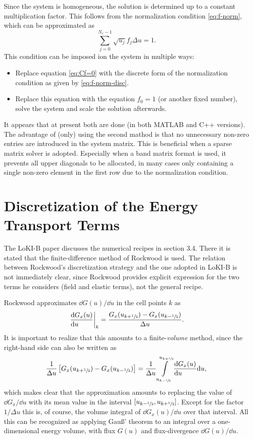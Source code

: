 \documentclass{book}
\newcommand{\frachalf}{\ensuremath{\sfrac{1}{2}}}
\newcommand{\phalf}[1]{\ensuremath{{#1}+\frachalf}}
\newcommand{\mhalf}[1]{\ensuremath{{#1}-\frachalf}}
\begin{document}
Since the system is homogeneous, the solution is determined up to a constant
multiplication factor. This follows from the normalization condition
\eqref{eq:f-norm}, which can be approximated as
\begin{equation}
  \sum\limits_{j=0}^{N_c-1} \sqrt{u_j} f_j \Delta u = 1.
  \label{eq:f-norm-disc}
\end{equation}
This condition can be imposed ion the system in multiple ways:
\begin{itemize}
  \item Replace equation \eqref{eq:Cf=0} with the discrete form of the
    normalization condition as given by \eqref{eq:f-norm-disc}.
  \item Replace this equation with the equation $f_0=1$ (or another fixed
    number), solve the system and scale the solution afterwards.
\end{itemize}
It appears that at present both are done (in both MATLAB and C++ versions). The
advantage of (only) using the second mathod is that no unnecessary non-zero
entries are introduced in the system matrix. This is beneficial when a sparse
matrix solver is adopted. Especially when a band matrix format is used, it
prevents all upper diagonals to be allocated, in many cases only containing
a single non-zero element in the first row due to the normalization condition.

\section{Discretization of the Energy Transport Terms}
\label{sec:dGdu-disc}

The LoKI-B paper \cite{Tejero2019} discusses the numerical recipes in
section 3.4. There it is stated that the finite-difference method of
Rockwood \cite[appendix A]{Rockwood1973} is used. The relation between Rockwood's
discretization strategy and the one adopted in LoKI-B is not immediately
clear, since Rockwood provides explicit expression for the two terms
he considers (field and elastic terms), not the general recipe.

Rockwood approximates $\dd{G(u)}/\dd{u}$ in the cell points $k$ as
\begin{equation}
  \left.\DERIV{G_x(u)}{u}\right|_k
  = \frac{G_x(u_{\phalf{k}}) - G_x(u_{\mhalf{k}})}{\Delta u}.
\end{equation}
It is important to realize that this amounts to a finite-{\em volume} method,
since the right-hand side can also be written as
\[
  \frac{1}{\Delta u}\left[G_x(u_{\phalf{k}}) - G_x(u_{\mhalf{k}})\right]
  =
  \frac{1}{\Delta u}\int\limits_{u_{\mhalf{k}}}^{u_{\phalf{k}}}\DERIV{G_x(u)}{u}\dd{u},
\]
which makes clear that the approximation amounts to replacing the value of
$\dd G_x/\dd u$ with its mean value in the interval
$[u_{\mhalf{k}},u_{\phalf{k}}]$. Except for the factor $1/\Delta u$ this is,
of course, the volume integral of $\dd G_x(u)/\dd u$ over that interval.
All this can be recognized as applying Gau\ss' theorem to an integral over
a one-dimensional energy volume, with flux $G(u)$ and flux-divergence
$\dd G(u)/\dd u$.
\end{document}
